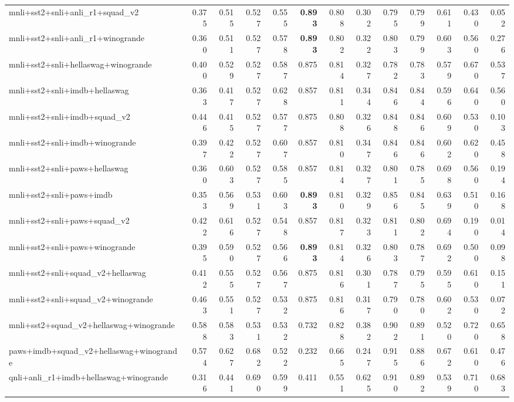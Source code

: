 \begin{table}[t]
\begin{tabular}{lrrrrrrrrrrrr}
    mnli+sst2+snli+anli\_r1+squad\_v2 & 0.375 & 0.515 & 0.527 & 0.555 & \textbf{0.893} & 0.808 & 0.302 & 0.795 & 0.799 & 0.611 & 0.430 & 0.052 \\
    mnli+sst2+snli+anli\_r1+winogrande & 0.360 & 0.511 & 0.527 & 0.578 & \textbf{0.893} & 0.802 & 0.322 & 0.803 & 0.799 & 0.603 & 0.560 & 0.276 \\
    mnli+sst2+snli+hellaswag+winogrande & 0.400 & 0.529 & 0.527 & 0.587 & 0.875 & 0.814 & 0.327 & 0.782 & 0.783 & 0.579 & 0.670 & 0.537 \\
    mnli+sst2+snli+imdb+hellaswag & 0.363 & 0.417 & 0.527 & 0.628 & 0.857 & 0.811 & 0.344 & 0.846 & 0.844 & 0.596 & 0.640 & 0.560 \\
    mnli+sst2+snli+imdb+squad\_v2 & 0.446 & 0.415 & 0.527 & 0.577 & 0.875 & 0.808 & 0.326 & 0.848 & 0.846 & 0.609 & 0.530 & 0.103 \\
    mnli+sst2+snli+imdb+winogrande & 0.397 & 0.422 & 0.527 & 0.607 & 0.857 & 0.810 & 0.347 & 0.846 & 0.846 & 0.602 & 0.620 & 0.458 \\
    mnli+sst2+snli+paws+hellaswag & 0.360 & 0.603 & 0.527 & 0.585 & 0.857 & 0.814 & 0.327 & 0.801 & 0.785 & 0.698 & 0.560 & 0.194 \\
    mnli+sst2+snli+paws+imdb & 0.353 & 0.569 & 0.531 & 0.603 & \textbf{0.893} & 0.810 & 0.329 & 0.856 & 0.845 & 0.639 & 0.510 & 0.168 \\
    mnli+sst2+snli+paws+squad\_v2 & 0.422 & 0.616 & 0.527 & 0.548 & 0.857 & 0.817 & 0.323 & 0.811 & 0.802 & 0.694 & 0.190 & 0.014 \\
    mnli+sst2+snli+paws+winogrande & 0.395 & 0.590 & 0.527 & 0.566 & \textbf{0.893} & 0.814 & 0.326 & 0.803 & 0.787 & 0.692 & 0.500 & 0.098 \\
    mnli+sst2+snli+squad\_v2+hellaswag & 0.412 & 0.555 & 0.527 & 0.567 & 0.875 & 0.816 & 0.301 & 0.787 & 0.795 & 0.595 & 0.610 & 0.151 \\
    mnli+sst2+snli+squad\_v2+winogrande & 0.463 & 0.551 & 0.527 & 0.532 & 0.875 & 0.816 & 0.317 & 0.790 & 0.780 & 0.602 & 0.530 & 0.072 \\
    mnli+sst2+squad\_v2+hellaswag+winogrande & 0.588 & 0.583 & 0.531 & 0.532 & 0.732 & 0.828 & 0.382 & 0.902 & 0.891 & 0.520 & 0.720 & 0.658 \\
    paws+imdb+squad\_v2+hellaswag+winogrande & 0.574 & 0.627 & 0.682 & 0.522 & 0.232 & 0.665 & 0.247 & 0.915 & 0.886 & 0.672 & 0.610 & 0.476 \\
    qnli+anli\_r1+imdb+hellaswag+winogrande & 0.316 & 0.441 & 0.690 & 0.599 & 0.411 & 0.551 & 0.625 & 0.910 & 0.892 & 0.539 & 0.710 & 0.683 \\

\end{tabular}
\end{table}
